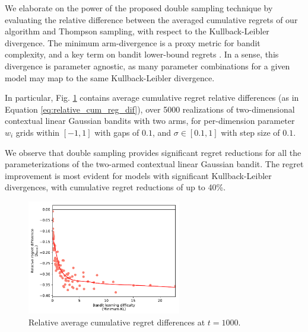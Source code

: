 \documentclass[10pt]{article}
\begin{document}
We elaborate on the power of the proposed double sampling technique by evaluating the relative difference between the averaged cumulative regrets of our algorithm and Thompson sampling, with respect to the Kullback-Leibler divergence. The minimum arm-divergence is a proxy metric for bandit complexity, and a key term on bandit lower-bound regrets \cite{j-Lai1985}. In a sense, this divergence is parameter agnostic, as many parameter combinations for a given model may map to the same Kullback-Leibler divergence.

In particular, Fig. \ref{fig:linearGaussian_relative_cumregret_kl} contains average cumulative regret relative differences (as in Equation \ref{eq:relative_cum_reg_dif}), over 5000 realizations of two-dimensional contextual linear Gaussian bandits with two arms, for per-dimension parameter $w_i$ grids within $[-1,1]$ with gaps of $0.1$, and $\sigma \in [0.1,1]$ with step size of $0.1$.

We observe that double sampling provides significant regret reductions for all the parameterizations of the two-armed contextual linear Gaussian bandit. The regret improvement is most evident for models with significant Kullback-Leibler divergences, with cumulative regret reductions of up to 40\%.

\begin{figure}[!h]
	\centering
	\includegraphics[width=0.6\textwidth]{./figs/linearGaussian/min_KL_relDiff_t1000_07.pdf}
	\caption{Relative average cumulative regret differences at $t=1000$.}
	\label{fig:linearGaussian_relative_cumregret_kl}
\end{figure}

%
\end{document}
